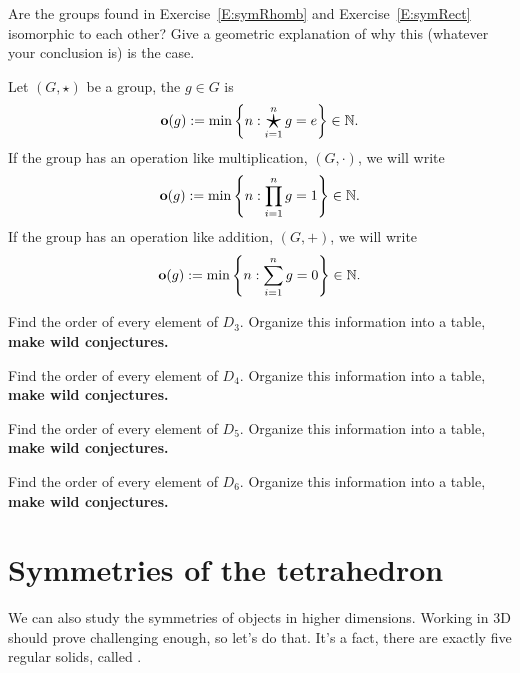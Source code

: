 \documentclass{ximera}
\begin{document}
\begin{exercise}
  Are the groups found in Exercise~\ref{E:symRhomb} and
  Exercise~\ref{E:symRect} isomorphic to each other?  Give a geometric
  explanation of why this (whatever your conclusion is) is the case.
\end{exercise}



\begin{definition}
  Let $(G,\star)$ be a group, the  $g\in G$ is
  \[
  \o(g) := \min\left\{n: \bigstar_{i=1}^n g = e\right\}\in\N.
  \]
  If the group has an operation like multiplication, $(G,\cdot)$, we will write
  \[
  \mathbf o(g) := \min\left\{n: \prod_{i=1}^n g = 1\right\}\in\mathbb N.
  \]
  If the group has an operation like addition, $(G,+)$, we will write
  \[
  \mathbf o(g) := \min\left\{n: \sum_{i=1}^n g = 0\right\}\in\mathbb N.
  \]
\end{definition}

\begin{exercise}
   Find the order of every element of $D_3$. Organize this information
   into a table, \textbf{make wild conjectures.}
\end{exercise}



\begin{exercise}
   Find the order of every element of $D_4$. Organize this information
   into a table, \textbf{make wild conjectures.}
\end{exercise}

\begin{exercise}
   Find the order of every element of $D_5$. Organize this information
   into a table, \textbf{make wild conjectures.}
\end{exercise}

\begin{exercise}
   Find the order of every element of $D_6$. Organize this information
   into a table, \textbf{make wild conjectures.}
\end{exercise}



\section{Symmetries of the tetrahedron}


We can also study the symmetries of objects in higher
dimensions. Working in $3$D should prove challenging enough, so let's
do that. It's a fact, there are exactly five regular solids, called
.
\end{document}

